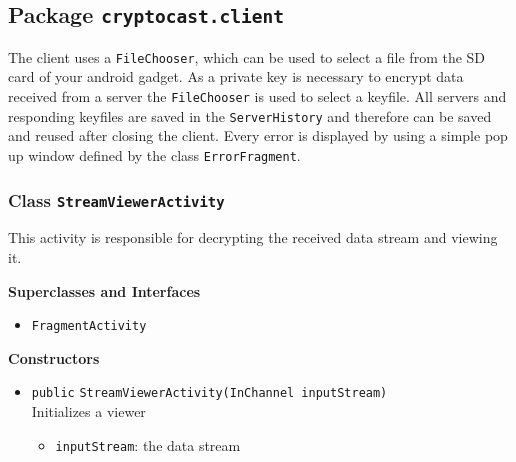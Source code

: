 \subsection{Package \lstinline!cryptocast.client!}
The client uses a \lstinline|FileChooser|, which can be used to select a file from the SD card of your android gadget.
 As a private key is necessary to encrypt data received from a server the \lstinline|FileChooser| is used to select a keyfile.
 All servers and responding keyfiles are saved in the \lstinline|ServerHistory| and therefore can be saved and reused after closing the client.
 Every error is displayed by using a simple pop up window defined by the class \lstinline|ErrorFragment|.
\subsubsection{Class \lstinline|StreamViewerActivity|}
This activity is responsible for decrypting the received data
 stream and viewing it. \\



\textbf{Superclasses and Interfaces}
\begin{itemize}
\item \lstinline|FragmentActivity|
\end{itemize}



\textbf{Constructors}
\begin{itemize}
\item \lstinline|public| \lstinline|StreamViewerActivity|\lstinline|(InChannel inputStream)|\\
Initializes a viewer
\begin{itemize}
\item \lstinline|inputStream|: the data stream
\end{itemize}



\end{itemize}


